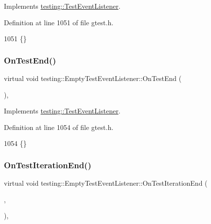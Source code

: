 Implements \hyperlink{classtesting_1_1TestEventListener_ab4ed885d63f5bbff8076c1329b3dfe36}{testing\+::\+Test\+Event\+Listener}.



Definition at line 1051 of file gtest.\+h.


\begin{DoxyCode}
1051 \{\}
\end{DoxyCode}
\mbox{\label{classtesting_1_1EmptyTestEventListener_afd58d21005f0d0d0399fb114627545d3}} 
\subsubsection{\texorpdfstring{On\+Test\+End()}{OnTestEnd()}}
{\footnotesize\ttfamily virtual void testing\+::\+Empty\+Test\+Event\+Listener\+::\+On\+Test\+End (\begin{DoxyParamCaption}\item[{const \hyperlink{classtesting_1_1TestInfo}{Test\+Info} \&}]{ }\end{DoxyParamCaption})\hspace{0.3cm}{\ttfamily [inline]}, {\ttfamily [virtual]}}



Implements \hyperlink{classtesting_1_1TestEventListener_abb1c44525ef038500608b5dc2f17099b}{testing\+::\+Test\+Event\+Listener}.



Definition at line 1054 of file gtest.\+h.


\begin{DoxyCode}
1054 \{\}
\end{DoxyCode}
\mbox{\label{classtesting_1_1EmptyTestEventListener_a2253e5a18b3cf7bccd349567a252209d}} 
\subsubsection{\texorpdfstring{On\+Test\+Iteration\+End()}{OnTestIterationEnd()}}
{\footnotesize\ttfamily virtual void testing\+::\+Empty\+Test\+Event\+Listener\+::\+On\+Test\+Iteration\+End (\begin{DoxyParamCaption}\item[{const \hyperlink{classtesting_1_1UnitTest}{Unit\+Test} \&}]{,  }\item[{int}]{ }\end{DoxyParamCaption})\hspace{0.3cm}{\ttfamily [inline]}, {\ttfamily [virtual]}}



